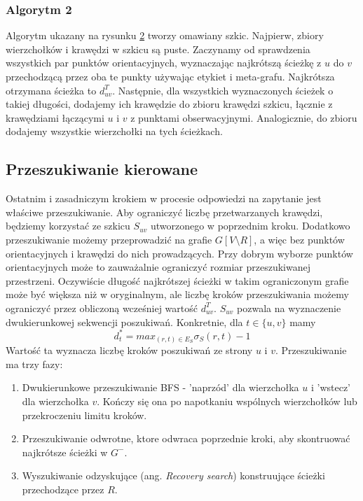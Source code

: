 \documentclass{article}
\theoremstyle{definition}
\begin{document}
        \subsubsection*{Algorytm 2} 
            Algorytm ukazany na rysunku \hyperref[fig:alg3]{2} tworzy omawiany szkic. Najpierw, zbiory wierzchołków i krawędzi w szkicu są puste. Zaczynamy od sprawdzenia wszystkich par punktów orientacyjnych, wyznaczając najkrótszą ścieżkę z $u$ do $v$ przechodzącą przez oba te punkty używając etykiet i meta-grafu. Najkrótsza otrzymana ścieżka to $d_{uv}^T$. Następnie, dla wszystkich wyznaczonych ścieżek o takiej długości, dodajemy ich krawędzie do zbioru krawędzi szkicu, łącznie z krawędziami łączącymi $u$ i $v$ z punktami obserwacyjnymi. Analogicznie, do zbioru dodajemy wszystkie wierzchołki na tych ścieżkach.
    
    \subsection{Przeszukiwanie kierowane}
        Ostatnim i zasadniczym krokiem w procesie odpowiedzi na zapytanie jest właściwe przeszukiwanie. Aby ograniczyć liczbę przetwarzanych krawędzi, będziemy korzystać ze szkicu $S_{uv}$ utworzonego w poprzednim kroku. Dodatkowo przeszukiwanie możemy przeprowadzić na grafie $G[V \setminus R]$, a więc bez punktów orientacyjnych i krawędzi do nich prowadzących. Przy dobrym wyborze punktów orientacyjnych może to zauważalnie  ograniczyć rozmiar przeszukiwanej przestrzeni. Oczywiście długość najkrótszej ścieżki w takim ograniczonym grafie może być większa niż w oryginalnym, ale liczbę kroków przeszukiwania możemy ograniczyć przez obliczoną wcześniej wartość $d_{uv}^T$. $S_{uv}$ pozwala na wyznaczenie dwukierunkowej sekwencji poszukiwań. Konkretnie, dla $t \in \{u,v\}$ mamy 
        \[
            d_{t}^{*} = max_{(r,t) \in E_S} \sigma_S(r, t) - 1
        \]
        Wartość ta wyznacza liczbę kroków poszukiwań ze strony $u$ i $v$. Przeszukiwanie ma trzy fazy:
        \begin{enumerate}
            \item Dwukierunkowe przeszukiwanie BFS - 'naprzód' dla wierzchołka $u$ i 'wstecz' dla wierzchołka $v$. Kończy się ona po napotkaniu wspólnych wierzchołków lub przekroczeniu limitu kroków. 
            \item Przeszukiwanie odwrotne, ktore odwraca poprzednie kroki, aby skontruować najkrótsze ścieżki w $G^{-}$. 
            \item Wyszukiwanie odzyskujące (ang. \textit{Recovery search}) konstruujące ścieżki przechodzące przez $R$. 
        \end{enumerate}
\end{document}
